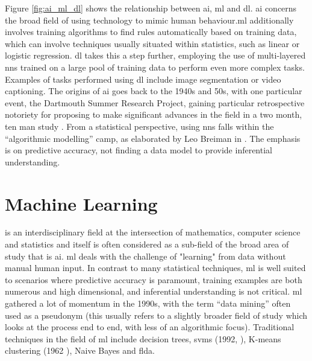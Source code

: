 Figure \ref{fig:ai_ml_dl} shows the relationship between \gls{ai}, \gls{ml} and \gls{dl}. \gls{ai} concerns the broad field of using technology to mimic human behaviour.\gls{ml} additionally involves training algorithms to find rules automatically based on training data, which can involve techniques usually situated within statistics, such as linear or logistic regression. \gls{dl} takes this a step further, employing the use of multi-layered \gls{nn}s trained on a large pool of training data to perform even more complex tasks. Examples of tasks performed using \gls{dl} include image segmentation or video captioning. The origins of \gls{ai} goes back to the 1940s and 50s, with one particular event, the Dartmouth Summer Research Project, gaining particular retrospective notoriety for proposing to make significant advances in the field in a two month, ten man study \cite{dartmouth_summer}. From a statistical perspective, using \gls{nn}s falls within the \enquote{algorithmic modelling} camp, as elaborated by Leo Breiman in \cite{two_cultures}. The emphasis is on predictive accuracy, not finding a data model to provide inferential understanding.

\section{Machine Learning}

 is an interdisciplinary field at the intersection of mathematics, computer science and statistics and itself is often considered as a sub-field of the broad area of study that is \gls{ai}. \gls{ml} deals with the challenge of "learning" from data without manual human input. In contrast to many statistical techniques, \gls{ml} is well suited to scenarios where predictive accuracy is paramount, training examples are both numerous and high dimensional, and inferential understanding is not critical. \gls{ml} gathered a lot of momentum in the 1990s, with the term \enquote{data mining} often used as a pseudonym (this usually refers to a slightly broader field of study which looks at the process end to end, with less of an algorithmic focus). Traditional techniques in the field of \gls{ml} include decision trees,  \gls{svm}s (1992, \cite{svm}), K-means clustering (1962 \cite{k_means}), Naive Bayes and  \gls{flda}.  
\bigskip

